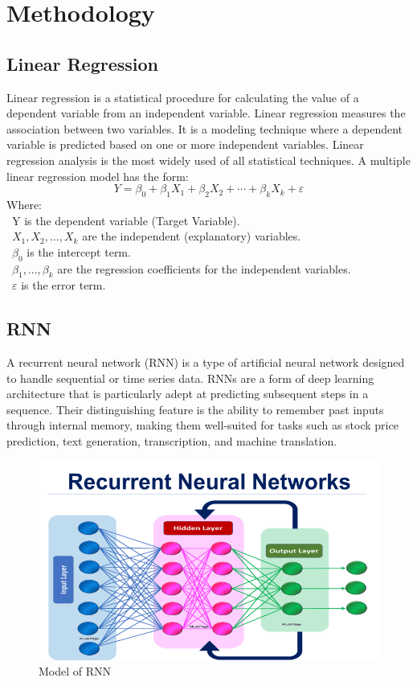 \documentclass{ieeeojies}
\begin{document}
\section{Methodology}
\subsection{Linear Regression}
Linear regression is a statistical procedure for calculating the value of a dependent variable from an independent variable. Linear regression measures the association between two variables. It is a modeling technique where a dependent variable is predicted based on one or more independent variables. Linear regression analysis is the most widely used of all statistical techniques.\cite{b15}
A multiple linear regression model has the form: \cite{b16}
\[Y=\beta_0+\beta_1X_1+\beta_2X_2+\cdots+\beta_kX_k+\varepsilon\]
Where:\\
	\indent\textbullet\ Y is the dependent variable (Target Variable).\\
	\indent\textbullet\ \(X_1, X_2, \ldots, X_k\) are the independent (explanatory) variables.\\
	\indent\textbullet\ \(\beta_0\) is the intercept term.\\
	\indent\textbullet\ \(\beta_1,..., \beta_k\) are the regression coefficients for the independent variables.\\
	\indent\textbullet\ \(\varepsilon\) is the error term.
 
\subsection{RNN}
A recurrent neural network (RNN) is a type of artificial neural network designed to handle sequential or time series data. RNNs are a form of deep learning architecture that is particularly adept at predicting subsequent steps in a sequence. Their distinguishing feature is the ability to remember past inputs through internal memory, making them well-suited for tasks such as stock price prediction, text generation, transcription, and machine translation.

\begin{figure}[H]
  \centering
  \begin{minipage}{0.8\linewidth}
    \centering
    \includegraphics[width=\linewidth]{bibliography/rnn_fig.png}
    \caption{Model of RNN}
    \label{fig7}
  \end{minipage}
\end{figure}
\end{document}
